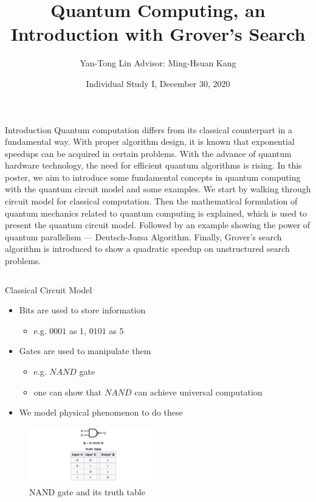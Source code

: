 \documentclass{beamer}
\title{\Large Quantum Computing, an Introduction with Grover's Search}
\author[Yan-Tong Lin]{Yan-Tong Lin {\small Advisor: Ming-Hsuan Kang}}
\institute[National Chiao Tung University]{{Department of Computer Science}, {National Chiao Tung University}, {Taiwan}}
\date{Individual Study I, December 30, 2020}
\newcommand{\<}{\langle}
\renewcommand{\>}{\rangle}
\begin{document}
\begin{frame}
\vfill
    \begin{block}{Introduction}
        Quantum computation differs from its classical counterpart in a fundamental way. With proper algorithm design, it is known that exponential speedups can be acquired in certain problems. With the advance of quantum hardware technology, the need for efficient quantum algorithms is rising.
        \newline\newline
        In this poster, we aim to introduce some fundamental concepts in quantum computing with the quantum circuit model and some examples. We start by walking through circuit model for classical computation. Then the mathematical formulation of quantum mechanics related to quantum computing is explained, which is used to present the quantum circuit model. Followed by an example showing the power of quantum parallelism --- Deutsch-Jozsa Algorithm. Finally, Grover's search algorithm is introduced to show a quadratic speedup on unstructured search problems. 
    \end{block}
\vfill
    \begin{columns}[t]
    \begin{column}{.48\linewidth}
        \begin{block}{Classical Circuit Model}

            \begin{itemize}
                \item Bits are used to store information
                    \begin{itemize}
                        \item e.g. $0001$ as $1$, $0101$ as $5$
                    \end{itemize}
                \item Gates are used to manipulate them
                    \begin{itemize}
                        \item e.g. $NAND$ gate
                        \item one can show that $NAND$ can achieve universal computation
                    \end{itemize}
                \item We model physical phenomenon to do these
            \end{itemize}
            
            \begin{figure}
                \centering
                \includegraphics[width=0.5\textwidth]{nand.png}
                \caption{NAND gate and its truth table}
                \label{fig:nand}
            \end{figure}
        

\end{block}
\end{column}
\end{columns}
\end{frame}
\end{document}
